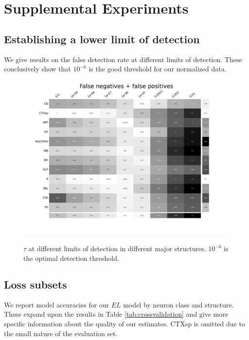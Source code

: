 \newpage

\section{Supplemental Experiments}
\label{supp_sec:exp}

\subsection{Establishing a lower limit of detection}
\label{supp:exp_lower}

We give results on the false detection rate at different limits of detection.
These conclusively show that $10^{-6}$ is the good threshold for our normalized data.
\begin{figure}[H]
    \centering
    \includegraphics[width = 7in]{figs/Threshold.png}
    \label{fig:threshold}
    \caption{$\tau$ at different limits of detection in different major structures.  $10^{-6}$ is the optimal detection threshold.}
\end{figure}

\newpage

\subsection{Loss subsets}
\label{supp_sec:loss_subsets}

We report model accuracies for our $EL$ model by neuron class and structure.
These expand upon the results in Table \ref{tab:crossvalidation} and give more specific information about the quality of our estimates.   CTXsp is omitted due to the small nature of the evaluation set.

